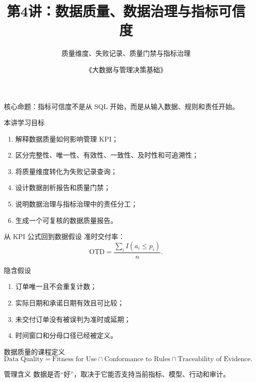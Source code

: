 \documentclass[UTF8,fontset=fandol,aspectratio=169,11pt]{ctexbeamer}
\title[数据质量与指标可信度]{第4讲：数据质量、数据治理与指标可信度}
\subtitle{质量维度、失败记录、质量门禁与指标治理}
\author{《大数据与管理决策基础》}
\date{}
\begin{document}
\begin{frame}
  \titlepage
  \begin{center}
    \small 核心命题：指标可信度不是从 SQL 开始，而是从输入数据、规则和责任开始。
  \end{center}
\end{frame}

\begin{frame}{本讲学习目标}
\begin{enumerate}
  \item 解释数据质量如何影响管理 KPI；
  \item 区分完整性、唯一性、有效性、一致性、及时性和可追溯性；
  \item 将质量维度转化为失败记录查询；
  \item 设计数据剖析报告和质量门禁；
  \item 说明数据治理与指标治理中的责任分工；
  \item 生成一个可复核的数据质量报告。
\end{enumerate}
\end{frame}

\begin{frame}{从 KPI 公式回到数据假设}
准时交付率：
\[
\text{OTD}=\frac{\sum_i I(a_i\le p_i)}{n}.
\]

\begin{block}{隐含假设}
\begin{enumerate}
  \item 订单唯一且不会重复计数；
  \item 实际日期和承诺日期有效且可比较；
  \item 未交付订单没有被误判为准时或延期；
  \item 时间窗口和分母口径已经被定义。
\end{enumerate}
\end{block}
\end{frame}

\begin{frame}{数据质量的课程定义}
\[
\text{Data Quality}
=
\text{Fitness for Use}
\cap
\text{Conformance to Rules}
\cap
\text{Traceability of Evidence}.
\]

\begin{alertblock}{管理含义}
数据是否“好”，取决于它能否支持当前指标、模型、行动和审计。
\end{alertblock}
\end{frame}
\end{document}
